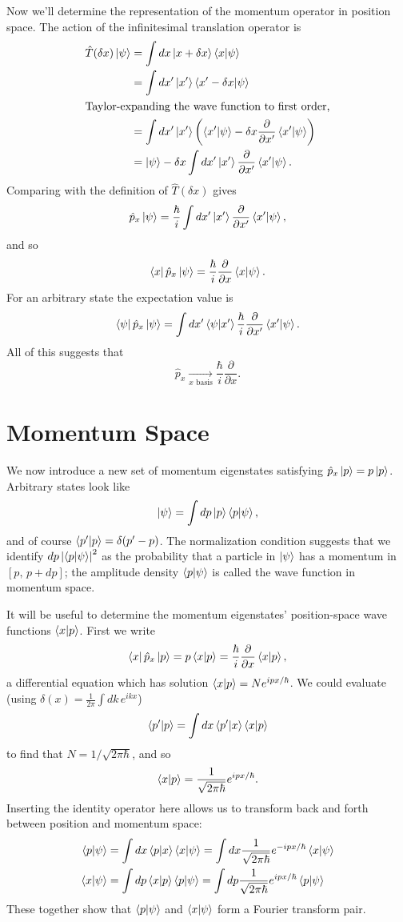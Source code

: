 \documentclass[../p116main.tex]{subfiles}
\begin{document}
Now we'll determine the representation of the momentum operator in position space.
The action of the infinitesimal translation operator is
\begin{align*}
    \hat T(\delta x) \left| \psi \right> &= \int dx \left| x + \delta x \right> \left< x \middle| \psi \right> \\
    &= \int dx' \left| x' \right> \left< x' - \delta x \middle| \psi \right> \\
    \intertext{Taylor-expanding the wave function to first order,}
    &= \int dx' \left| x' \right> \left( \left< x' \middle| \psi \right> - \delta x \frac{\partial}{\partial x'} \left< x' \middle| \psi \right> \right) \\
    &= \left| \psi \right> - \delta x \int dx' \left| x' \right> \frac{\partial}{\partial x'} \left< x' \middle| \psi \right>.
\end{align*}
Comparing with the definition of $\hat T(\delta x)$ gives
\[ \hat p_x \left| \psi \right> = \frac{\hbar}{i} \int dx' \left| x' \right> \frac{\partial}{\partial x'} \left< x' \middle| \psi \right>, \]
and so
\[ \left< x \right| \hat p_x \left| \psi \right> = \frac{\hbar}{i} \frac{\partial}{\partial x} \left< x \middle| \psi \right>. \]
For an arbitrary state the expectation value is
\[ \left< \psi \right| \hat p_x \left| \psi \right> = \int dx' \left< \psi \middle| x' \right> \frac{\hbar}{i} \frac{\partial}{\partial x'} \left< x' \middle| \psi \right>. \]
All of this suggests that
\[ \hat p_x \xrightarrow[x \textrm{ basis}]{} \frac{\hbar}{i} \frac{\partial}{\partial x}. \]

\section{Momentum Space}
We now introduce a new set of momentum eigenstates satisfying $\hat p_x \left| p \right> = p \left| p \right>$.
Arbitrary states look like
\[ \left| \psi \right> = \int dp \left| p \right> \left< p \middle| \psi \right>, \]
and of course $\left< p' \middle| p \right> = \delta(p' - p)$.
The normalization condition suggests that we identify $dp \left| \left< p \middle| \psi \right> \right|^2$ as the probability that a particle in $\left| \psi \right>$ has a momentum in $[p, \, p + dp]$; the amplitude density $\left< p \middle| \psi \right>$ is called the wave function in momentum space.

It will be useful to determine the momentum eigenstates' position-space wave functions $\left< x \middle| p \right>$.
First we write
\[ \left< x \right| \hat p_x \left| p \right> = p \left< x \middle| p \right> = \frac{\hbar}{i} \frac{\partial}{\partial x} \left< x \middle| p \right>, \]
a differential equation which has solution $\left< x \middle| p \right> = N e^{ipx / \hbar}$.
We could evaluate (using $\delta(x) = \frac{1}{2\pi} \int dk \, e^{ikx}$)
\[ \left< p' \middle| p \right> = \int dx \left< p' \middle| x \right> \left< x \middle| p \right> \]
to find that $N = 1 / \sqrt{2\pi \hbar}$, and so
\[ \left< x \middle| p \right> = \frac{1}{\sqrt{2\pi \hbar}} e^{ipx / \hbar}. \]
Inserting the identity operator here allows us to transform back and forth between position and momentum space:
\begin{align*}
    \left< p \middle| \psi \right> &= \int dx \left< p \middle| x \right> \left< x \middle| \psi \right> = \int dx \frac{1}{\sqrt{2\pi \hbar}} e^{-ipx / \hbar} \left< x \middle| \psi \right> \\
    \left< x \middle| \psi \right> &= \int dp \left< x \middle| p \right> \left< p \middle| \psi \right> = \int dp \frac{1}{\sqrt{2\pi \hbar}} e^{ipx / \hbar} \left< p \middle| \psi \right>
\end{align*}
These together show that $\left< p \middle| \psi \right>$ and $\left< x \middle| \psi \right>$ form a Fourier transform pair.
\end{document}
